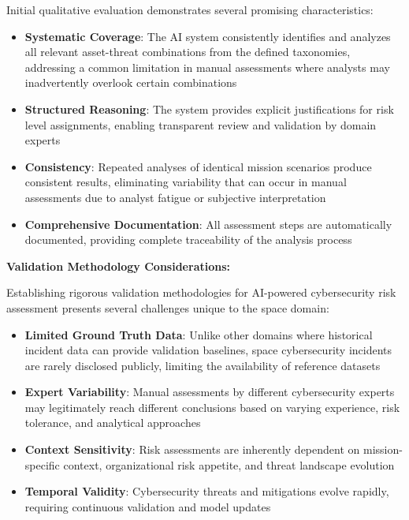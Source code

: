 \documentclass[binding=0.6cm]{sapthesis}
\begin{document}
Initial qualitative evaluation demonstrates several promising characteristics:

\begin{itemize}
    \item \textbf{Systematic Coverage}: The AI system consistently identifies and analyzes all relevant asset-threat combinations from the defined taxonomies, addressing a common limitation in manual assessments where analysts may inadvertently overlook certain combinations
    \item \textbf{Structured Reasoning}: The system provides explicit justifications for risk level assignments, enabling transparent review and validation by domain experts
    \item \textbf{Consistency}: Repeated analyses of identical mission scenarios produce consistent results, eliminating variability that can occur in manual assessments due to analyst fatigue or subjective interpretation
    \item \textbf{Comprehensive Documentation}: All assessment steps are automatically documented, providing complete traceability of the analysis process
\end{itemize}

\textbf{Validation Methodology Considerations:}

Establishing rigorous validation methodologies for AI-powered cybersecurity risk assessment presents several challenges unique to the space domain:

\begin{itemize}
    \item \textbf{Limited Ground Truth Data}: Unlike other domains where historical incident data can provide validation baselines, space cybersecurity incidents are rarely disclosed publicly, limiting the availability of reference datasets
    \item \textbf{Expert Variability}: Manual assessments by different cybersecurity experts may legitimately reach different conclusions based on varying experience, risk tolerance, and analytical approaches
    \item \textbf{Context Sensitivity}: Risk assessments are inherently dependent on mission-specific context, organizational risk appetite, and threat landscape evolution
    \item \textbf{Temporal Validity}: Cybersecurity threats and mitigations evolve rapidly, requiring continuous validation and model updates
\end{itemize}
\end{document}
